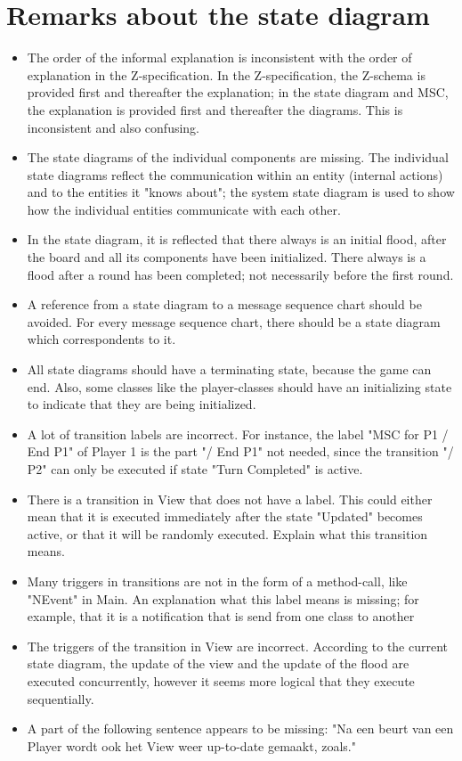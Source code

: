 \documentclass[a4paper,11pt]{article}
\begin{document}
	\section{Remarks about the state diagram}
    \begin{itemize}
        \item The order of the informal explanation is inconsistent with the order of explanation in the Z-specification. In the Z-specification, the Z-schema is provided first and thereafter the explanation; in the state diagram and MSC, the explanation is provided first and thereafter the diagrams. This is inconsistent and also confusing.
        \item The state diagrams of the individual components are missing. The individual state diagrams reflect the communication within an entity (internal actions) and to the entities it "knows about"; the system state diagram is used to show how the individual entities communicate with each other.
        \item In the state diagram, it is reflected that there always is an initial flood, after the board and all its components have been initialized. There always is a flood after a round has been completed; not necessarily before the first round.
        \item A reference from a state diagram to a message sequence chart should be avoided. For every message sequence chart, there should be a state diagram which correspondents to it.
        \item All state diagrams should have a terminating state, because the game can end. Also, some classes like the player-classes should have an initializing state to indicate that they are being initialized.
        \item A lot of transition labels are incorrect. For instance, the label "MSC for P1 / End P1" of Player 1 is the part "/ End P1" not needed, since the transition "/ P2" can only be executed if state "Turn Completed" is active.
        \item There is a transition in View that does not have a label. This could either mean that it is executed immediately after the state "Updated" becomes active, or that it will be randomly executed. Explain what this transition means.
        \item Many triggers in transitions are not in the form of a method-call, like "NEvent" in Main. An explanation what this label means is missing; for example, that it is a notification that is send from one class to another
        \item The triggers of the transition in View are incorrect. According to the current state diagram, the update of the view and the update of the flood are executed concurrently, however it seems more logical that they execute sequentially.
        \item A part of the following sentence appears to be missing: "Na een beurt van een Player wordt ook het View weer up-to-date gemaakt, zoals."
    \end{itemize}
\end{document}
